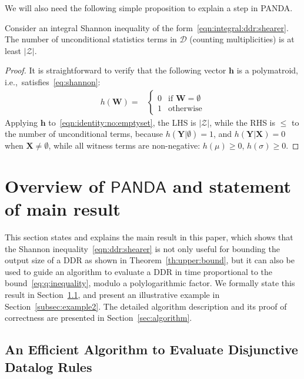 \documentclass{theoretics}
\newcommand{\calD}{\mathcal D}
\newcommand{\calZ}{\mathcal Z}
\newcommand{\panda}{\textsf{PANDA}\xspace}
\begin{document}
We will also need the following simple proposition to explain a step in \panda.

\begin{proposition}
Consider an integral Shannon inequality of the form~\eqref{eqn:integral:ddr:shearer}.
The number of unconditional statistics terms in $\calD$ (counting multiplicities)
is at least $|\calZ|$.
\label{prop:whole:terms}
\end{proposition}
\begin{proof}
It is straightforward to verify that the following vector $\bm h$ is a polymatroid,
i.e.,~satisfies~\eqref{eq:shannon}:
\begin{align*}
  h(\bm W) = &
               \begin{cases}
                 0 & \mbox{if $\bm W = \emptyset$}\\
                 1 & \mbox{otherwise}
               \end{cases}
\end{align*}
Applying $\bm h$ to~\eqref{eqn:identity:no:emptyset}, the LHS is $|\calZ|$, while the RHS
is $\leq$ to the number of unconditional terms, because
$h(\bm Y | \emptyset) =1$, and
$h(\bm Y | \bm X) =0$ when $\bm X \neq \emptyset$, while all witness terms are non-negative:
$h(\mu)\geq 0$, $h(\sigma)\geq 0$.
\end{proof}


\section{Overview of $\panda$ and statement of main result}
\label{sec:main:results}
This section states and explains the main result in this paper, which shows that the
Shannon inequality~\eqref{eqn:ddr:shearer} is not only useful for bounding the output size
of a DDR as shown in Theorem~\ref{th:upper:bound}, but it can also be used to guide an algorithm
to evaluate a DDR in time proportional to the bound~\eqref{eq:q:inequality}, modulo a
polylogarithmic factor.
We formally state this result in Section~\ref{subsec:main:result}, and present an illustrative
example in Section~\ref{subsec:example2}.
The detailed algorithm description and its proof of correctness are presented in Section~\ref{sec:algorithm}.

\subsection{An Efficient Algorithm to Evaluate Disjunctive Datalog Rules}
\label{subsec:main:result}
\end{document}
